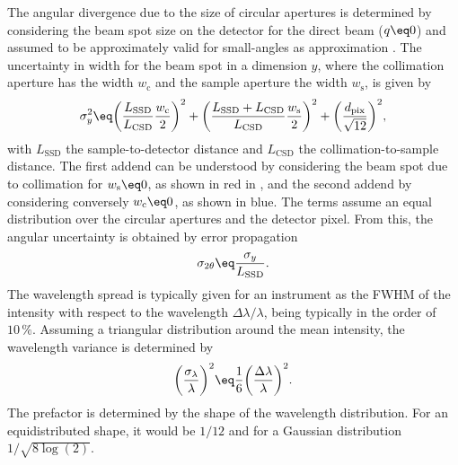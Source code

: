 \documentclass[\main/dresen_thesis.tex]{subfiles}
\begin{document}
    The angular divergence due to the size of circular apertures is determined by considering the beam spot size on the detector for the direct beam ($q \eq 0$) and assumed to be approximately valid for small-angles as approximation \cite{Pedersen_1990_Analy}.
    The uncertainty in width for the beam spot in a dimension $y$, where the collimation aperture has the width $w_\mathrm{c}$ and the sample aperture the width $w_\mathrm{s}$, is given by \cite{Mildner_2005_Arefr, Hammouda_2006_Thesa}
    \begin{align}
      \sigma_y^2 \eq
        \biggl( \frac{L_\mathrm{SSD}}{L_\mathrm{CSD}} \frac{w_\mathrm{c}}{2} \biggr)^2 +
        \biggl( \frac{L_\mathrm{SSD} + L_\mathrm{CSD}}{L_\mathrm{CSD}} \frac{w_\mathrm{s}}{2} \biggr)^2 +
        \biggl( \frac{d_\mathrm{pix}}{\sqrt{12}} \biggr)^2,
    \end{align}
    with $L_\mathrm{SSD}$ the sample-to-detector distance and $L_\mathrm{CSD}$ the collimation-to-sample distance.
    The first addend can be understood by considering the beam spot due to collimation for $w_\mathrm{s} \eq 0$, as shown in red in , and the second addend by considering conversely $w_\mathrm{c} \eq 0$, as shown in blue.
    The terms assume an equal distribution over the circular apertures and the detector pixel.
    From this, the angular uncertainty is obtained by error propagation
    \begin{align}
      \label{eq:methods:sans:formulaResolution}
      \sigma_{2 \theta} \eq \frac{\sigma_{y}}{L_{\mathrm{SSD}}}.
    \end{align}
    The wavelength spread is typically given for an instrument as the FWHM of the intensity with respect to the wavelength $\Delta \lambda / \lambda$, being typically in the order of $10 \, \%$.
    Assuming a triangular distribution around the mean intensity, the wavelength variance is determined by
    \begin{align}
      \biggl( \frac{\sigma_\lambda}{\lambda} \biggr)^2 \eq \frac{1}{6} \biggl( \frac{\Delta \lambda}{\lambda} \biggr)^2.
    \end{align}
    The prefactor is determined by the shape of the wavelength distribution. For an equidistributed shape, it would be $1/12$ and for a Gaussian distribution $1/\sqrt{8\log(2)}$.
\end{document}
